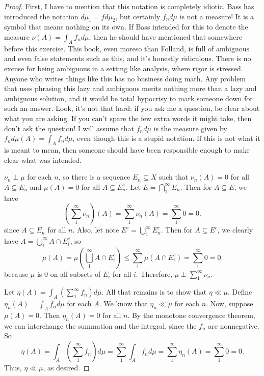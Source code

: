 \documentclass[10pt]{article}
\newcommand{\Int}{{\displaystyle \int}}
\begin{document}
\begin{enumerate}
\begin{proof}
First, I have to mention that this notation is completely idiotic.  Bass has introduced the notation $d\mu_1 = f d\mu_2$, but certainly $f_n d\mu$ is not a measure!  It is a symbol that means nothing on its own.  If Bass intended for this to denote the measure $\nu(A) = \Int_A f_n d\mu$, then he should have mentioned that somewhere before this exercise.  This book, even moreso than Folland, is full of ambiguous and even false statements such as this, and it's honestly ridiculous.  There is no excuse for being ambiguous in a setting like analysis, where rigor is stressed.  Anyone who writes things like this has no business doing math.  Any problem that uses phrasing this lazy and ambiguous merits nothing more than a lazy and ambiguous solution, and it would be total hypocrisy to mark someone down for such an answer.  Look, it's not that hard: if you ask me a question, be clear about what you are asking.  If you can't spare the few extra words it might take, then don't ask the question!  I will assume that $f_n d\mu$ is the measure given by $f_n d\mu(A) = \Int_A f_n d\mu$, even though this is a stupid notation.  If this is not what it is meant to mean, then someone should have been responsible enough to make clear what was intended.

$\nu_n \perp \mu$ for each $n$, so there is a sequence $E_n \subseteq X$ such that $\nu_n(A) = 0$ for all $A \subseteq E_n$ and $\mu(A) = 0$ for all $A \subseteq E_n^c$.  Let $E = \bigcap_1^\infty E_n$.  Then for $A \subseteq E$, we have
$$
\left( \sum_1^\infty \nu_n \right)(A) = \sum_1^\infty \nu_n(A) = \sum_1^\infty 0 = 0.
$$
since $A \subseteq E_n$ for all $n$.  Also, let note $E^c = \bigcup_1^\infty E_n^c$.  Then for $A \subseteq E^c$, we clearly have $A = \bigcup_1^\infty A \cap E_i^c$, so
$$
\mu(A) = \mu(\bigcup_1^\infty A \cap E_i^c) \leq \sum_1^\infty \mu(A \cap E_i^c) = \sum_1^\infty 0 = 0.
$$
because $\mu$ is $0$ on all subsets of $E_i$ for all $i$.  Therefore, $\mu \perp \sum_1^\infty \nu_n$.

Let $\eta(A) = \int_A \left( \sum_1^\infty f_n \right) d\mu$.  All that remains is to show that $\eta \ll \mu$.  Define $\eta_n(A) = \int_A f_n d\mu$ for each $A$.  We know that $\eta_n \ll \mu$ for each $n$.  Now, suppose $\mu(A) = 0$.  Then $\eta_n(A) = 0$ for all $n$.  By the monotone convergence theorem, we can interchange the summation and the integral, since the $f_n$ are nonnegative.  So
$$
\eta(A) = \int_A \left( \sum_1^\infty f_n \right) d\mu = \sum_1^\infty \Int_A f_n d\mu = \sum_1^\infty \eta_n(A) = \sum_1^\infty 0 = 0.
$$
Thus, $\eta \ll \mu$, as desired.
\end{proof}


\end{enumerate}
\end{document}
